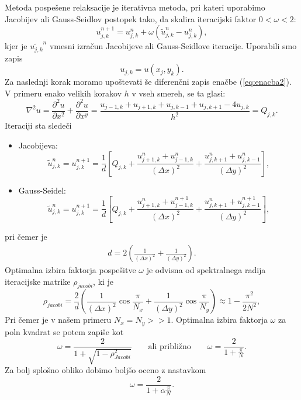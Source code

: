 \documentclass[12pt,a4paper]{article}
\begin{document}
Metoda pospešene relaksacije je iterativna metoda, pri kateri uporabimo Jacobijev ali Gauss-Seidlov postopek tako, da skalira iteracijski faktor $0 <\omega<2$:
\begin{equation*}
u_{j,k} ^{n+1} = u_{j,k} ^{n} + \omega \left( \tilde{u}_{j,k} ^{n} - u_{j,k} ^{n}  \right),
\end{equation*}
kjer je $\tilde{u_{j,k}}^{n}$ vmesni izračun Jacobijeve ali Gauss-Seidlove iteracije. Uporabili smo zapis 
\begin{equation*}
u_{j,k}=u(x_j,y_k).
\end{equation*}
Za naslednji korak moramo upoštevati še diferenčni zapis enačbe (\ref{eq:enacba2}). V primeru enako velikih korakov $h$ v vseh smereh, se ta glasi:
\begin{equation} \label{eq:enacba5}
\nabla ^{2} u= \frac{\partial ^{2} u }{\partial x^{2}} + \frac{\partial ^{2} u }{\partial x^{y}} = \frac{u_{j-1,k}+ u_{j+1,k} + u _{j,k-1} + u_{j,k+1} - 4u_{j,k} }{h^{2}}=Q_{j,k}.
\end{equation}
Iteraciji sta sledeči
\begin{itemize}
\item Jacobijeva: \\
\begin{equation} \label{eq:enacba6}
\tilde{u}_{j,k} ^{n}= u_{j,k} ^{n+1}= \frac{1}{d}\left[Q_{j,k} + \frac{u_{j+1,k}^{n} + u_{j-1,k}^{n}}{(\Delta x)^{2}} + \frac{u_{j,k+1}^{n} + u_{j,k-1}^{n}}{(\Delta y)^{2}} \right],
\end{equation}
\item Gauss-Seidel:\\
\begin{equation}
\tilde{u}_{j,k} ^{n}= u_{j,k} ^{n+1}= \frac{1}{d}\left[Q_{j,k} + \frac{u_{j+1,k}^{n} + u_{j-1,k}^{n+1}}{(\Delta x)^{2}} + \frac{u_{j,k+1}^{n} + u_{j,k-1}^{n+1}}{(\Delta y)^{2}} \right],
\end{equation}
\end{itemize}
pri čemer je
\begin{align*}
d= 2 \left( \frac{1}{(\Delta x)^{2}} +\frac{1}{(\Delta y)^{2}} \right).
\end{align*}
Optimalna izbira faktorja pospešitve $\omega$ je odvisna od spektralnega radija iteracijske matrike  $\rho_{jacobi}$, ki je 
\begin{equation}
 \rho_{jacobi}= \frac{2}{d}\left(\frac{1}{(\Delta x)^{2}}\cos \frac{\pi}{N_x}  +\frac{1}{(\Delta y)^{2}}\cos \frac{\pi}{N_y}     \right) \approx 1- \frac{\pi ^{2}}{2N^{2}},
\end{equation}
Pri čemer je v našem primeru $N_x = N_y >>1$. Optimalna izbira faktorja $\omega$ za poln kvadrat se potem zapiše kot
\begin{equation} \label{eq:enacba10}
\omega=\frac{2}{1+\sqrt{1- \rho_{Jacobi}^{2}}} \qquad \textrm{ali približno} \qquad \omega= \frac{2}{1+\frac{\pi}{N}}.
\end{equation}
Za bolj splošno obliko dobimo boljšo oceno z nastavkom
\begin{equation}
\omega = \frac{2}{1+ \alpha \frac{\pi}{N}}.
\end{equation} \newpage
\end{document}
